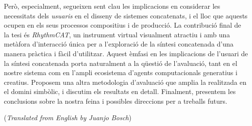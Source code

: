 Però, especialment, segueixen sent clau les implicacions en considerar les necessitats dels \textit{usuaris} en el disseny de sistemes concatenats, i el lloc que aquests ocupen en els seus processos compositius i de producció. La contribució final de la tesi és \textit{RhythmCAT}, un instrument virtual visualment atractiu i amb una metàfora d'interacció única per a l'exploració de la síntesi concatenada d'una manera pràctica i fàcil d'utilitzar. Aquest èmfasi en les implicacions de l'usuari de la síntesi concatenada porta naturalment a la qüestió de l'avaluació, tant en el nostre sistema com en l'ampli ecosistema d'agents computacionals generatius i creatius. Proposem una altra metodologia d'avaluació que amplia la realitzada en el domini simbòlic, i discutim els resultats en detall. Finalment, presentem les conclusions sobre la nostra feina i possibles direccions per a treballs futurs.


\vfill
{\noindent (\emph{Translated from English by Juanjo Bosch})}